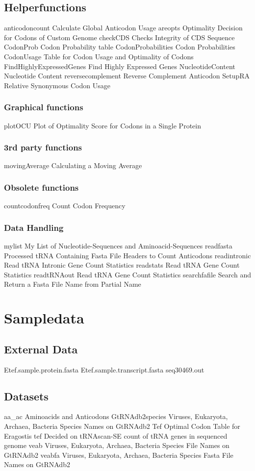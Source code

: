\subsection{Helperfunctions}
anticodoncount	Calculate Global Anticodon Usage
areopts	Optimality Decision for Codons of Custom Genome
checkCDS	Checks Integrity of CDS Sequence
CodonProb	Codon Probability table
CodonProbabilities	Codon Probabilities
CodonUsage	Table for Codon Usage and Optimality of Codons
FindHighlyExpressedGenes	Find Highly Expressed Genes				%
NucleotideContent	Nucleotide Content							%
reversecomplement	Reverse Complement Anticodon
SetupRA	Relative Synonymous Codon Usage

\subsubsection{Graphical functions}
plotOCU	Plot of Optimality Score for Codons in a Single Protein

\subsubsection{3rd party functions}
movingAverage	Calculating a Moving Average

\subsubsection{Obsolete functions}
countcodonfreq	Count Codon Frequency

\subsubsection{Data Handling}
mylist	My List of Nucleotide-Sequences and Aminoacid-Sequences
readfasta	Processed tRNA Containing Fasta File Headers to Count Anticodons
readintronic	Read tRNA Intronic Gene Count Statistics
readstats	Read tRNA Gene Count Statistics
readtRNAout	Read tRNA Gene Count Statistics
searchfafile	Search and Return a Fasta File Name from Partial Name

\section{Sampledata}

\subsection{External Data}
Etef.sample.protein.fasta
Etef.sample.transcript.fasta
seq30469.out

\subsection{Datasets}
aa\_ac	Aminoacids and Anticodons
GtRNAdb2species	Viruses, Eukaryota, Archaea, Bacteria Species Names on GtRNAdb2
Tef	Optimal Codon Table for Eragostis tef Decided on tRNAscan-SE count of tRNA genes in sequenced genome
veab		Viruses, Eukaryota, Archaea, Bacteria Species File Names on GtRNAdb2
veabfa	Viruses, Eukaryota, Archaea, Bacteria Species Fasta File Names on GtRNAdb2




